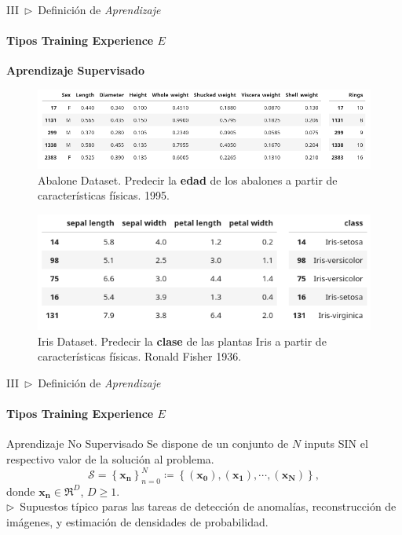 \documentclass[xcolor=dvipsnames]{beamer}
\begin{document}
    \begin{frame}{III~$\rhd$~Definición de \textit{Aprendizaje}}
    \framesubtitle{Tipos Training Experience \( E \)}
        \textbf{\Large{Aprendizaje Supervisado}}
        \vspace{2mm}
        \begin{figure}
            \centering
            \includegraphics[width=0.7\linewidth]{imgs/def02/abalone-df.png}
            \caption{Abalone Dataset. Predecir la \textbf{edad} de los abalones a partir de características físicas. 1995.}
        \end{figure}
        \begin{figure}
            \centering
            \includegraphics[width=0.55\linewidth]{imgs/def02/iris-df.png}
            \caption{Iris Dataset. Predecir la \textbf{clase} de las plantas Iris a partir de características físicas. Ronald Fisher 1936.}
        \end{figure}
    \end{frame}

    \begin{frame}{III~$\rhd$~Definición de \textit{Aprendizaje}}
    \framesubtitle{Tipos Training Experience \( E \)}
        \begin{block}{Aprendizaje No Supervisado}
        Se dispone de un conjunto de $N$ inputs SIN el respectivo valor de la solución al problema.
        \begin{equation*}
            \mathcal{S}=\left\{\mathbf{x_{n}}\right\}^{N}_{n=0}\coloneq \left\{ \left(\mathbf{x_{0}}\right), \left(\mathbf{x_{1}}\right), \cdots, \left(\mathbf{x_{N}}\right) \right\},
        \end{equation*}
        donde $\mathbf{x_{n}}\in\Re^{D}$, $D\geq1$.\\
        \vspace{2mm}
        $\rhd$~Supuestos típico paras las tareas de detección de anomalías, reconstrucción de imágenes, y estimación de densidades de probabilidad.
        \end{block}
    \end{frame}
\end{document}
